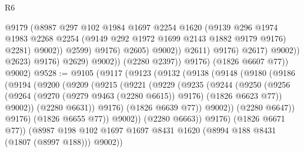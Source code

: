 \begin{lexlean}{R6}
\begin{coremodule}
                                            @9179
                                            (@8987
                                              @297
                                              @102
                                              @1984
                                              @1697
                                              @2254
                                              @1620
                                              (@9139
                                                @296
                                                @1974
                                                @1983
                                                @2268
                                                @2254
                                                (@9149 @292 @1972 @1699 @2143 @1882 @9179 @9176)
                                                @2281)
                                              @9002))
                                          @2599)
                                        @9176)
                                      @2605)
                                    @9002))
                                @2611)
                              @9176)
                            @2617)
                          @9002))
                      @2623)
                    @9176)
                  @2629)
                @9002))
            (@2280 @2397))
          @9176)
        (@1826 @6607 @77))
      @9002)
@9528 := @9105
    (@9117
      (@9123
        (@9132
          (@9138
            (@9148
              (@9180
                (@9186
                  (@9194
                    (@9200
                      (@9209
                        (@9215
                          (@9221
                            (@9229
                              (@9235
                                (@9244
                                  (@9250
                                    (@9256
                                      (@9264
                                        (@9270 (@9279 @9463 (@2280 @6615)) @9176)
                                        (@1826 @6623 @77))
                                      @9002))
                                  (@2280 @6631))
                                @9176)
                              (@1826 @6639 @77))
                            @9002))
                        (@2280 @6647))
                      @9176)
                    (@1826 @6655 @77))
                  @9002))
              (@2280 @6663))
            @9176)
          (@1826 @6671 @77))
        (@8987 @198 @102 @1697 @1697 @8431 @1620 (@8994 @188 @8431 (@1807 (@8997 @188))) @9002))

\end{coremodule}
\end{lexlean}

